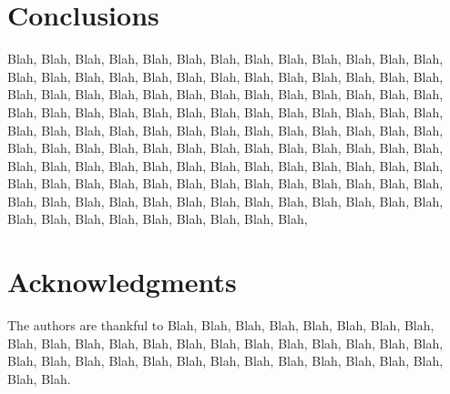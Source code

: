 \documentclass[lettersize,journal]{IEEEtran}
\def\ur#1{{\color{ured}#1}}
\def\rur#1{{\color{rured}#1}}
\begin{document}
\section{Conclusion\ur{s}}
\label{sec:four}
    Blah, Blah, Blah, Blah, Blah, Blah, Blah, Blah, Blah, Blah, Blah, Blah, Blah, Blah, Blah, Blah, Blah, Blah, 
    Blah, Blah, Blah, Blah, Blah, Blah, Blah, Blah, Blah, Blah, Blah, Blah, Blah, Blah, Blah, Blah, Blah, Blah, 
    Blah, Blah, Blah, Blah, Blah, Blah, Blah, Blah, Blah, Blah, Blah, Blah, Blah, Blah, Blah, Blah, Blah, Blah, 
    Blah, Blah, Blah, Blah, Blah, Blah, Blah, Blah, Blah, Blah, Blah, Blah, Blah, Blah, Blah, Blah, Blah, Blah, 
    Blah, Blah, Blah, Blah, Blah, Blah, Blah, Blah, Blah, Blah, Blah, Blah, Blah, Blah, Blah, Blah, Blah, Blah, 
    Blah, Blah, Blah, Blah, Blah, Blah, Blah, Blah, Blah, Blah, Blah, Blah, Blah, Blah, Blah, Blah, Blah, Blah, 
    Blah, Blah, Blah, Blah, Blah, Blah, Blah, Blah, Blah, Blah, Blah, Blah, Blah, Blah, Blah, Blah, Blah, Blah, 

\rur{
\section*{Acknowledgments}
	The authors are thankful to Blah, Blah, Blah, Blah, Blah, Blah, Blah, Blah, Blah, Blah, Blah, Blah, Blah, Blah, Blah, Blah, Blah, Blah, 
    Blah, Blah, Blah, Blah, Blah, Blah, Blah, Blah, Blah, Blah, Blah, Blah, Blah, Blah, Blah, Blah, Blah, Blah.}



\end{document}
